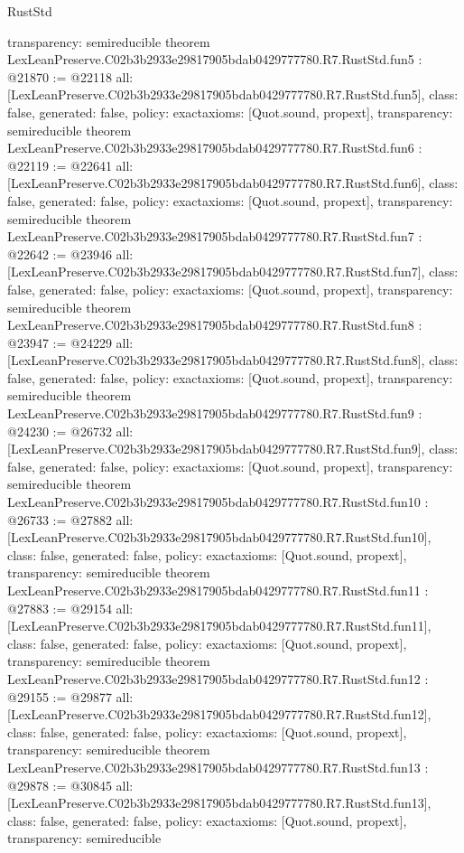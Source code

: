 \begin{lexlean}{RustStd}
\begin{coremodule}
{  transparency: semireducible
}
theorem LexLeanPreserve.C02b3b2933e29817905bdab0429777780.R7.RustStd.fun5 : @21870 := @22118 {
  all: [LexLeanPreserve.C02b3b2933e29817905bdab0429777780.R7.RustStd.fun5],
  class: false,
  generated: false,
  policy: exact{axioms: [Quot.sound, propext]},
  transparency: semireducible
}
theorem LexLeanPreserve.C02b3b2933e29817905bdab0429777780.R7.RustStd.fun6 : @22119 := @22641 {
  all: [LexLeanPreserve.C02b3b2933e29817905bdab0429777780.R7.RustStd.fun6],
  class: false,
  generated: false,
  policy: exact{axioms: [Quot.sound, propext]},
  transparency: semireducible
}
theorem LexLeanPreserve.C02b3b2933e29817905bdab0429777780.R7.RustStd.fun7 : @22642 := @23946 {
  all: [LexLeanPreserve.C02b3b2933e29817905bdab0429777780.R7.RustStd.fun7],
  class: false,
  generated: false,
  policy: exact{axioms: [Quot.sound, propext]},
  transparency: semireducible
}
theorem LexLeanPreserve.C02b3b2933e29817905bdab0429777780.R7.RustStd.fun8 : @23947 := @24229 {
  all: [LexLeanPreserve.C02b3b2933e29817905bdab0429777780.R7.RustStd.fun8],
  class: false,
  generated: false,
  policy: exact{axioms: [Quot.sound, propext]},
  transparency: semireducible
}
theorem LexLeanPreserve.C02b3b2933e29817905bdab0429777780.R7.RustStd.fun9 : @24230 := @26732 {
  all: [LexLeanPreserve.C02b3b2933e29817905bdab0429777780.R7.RustStd.fun9],
  class: false,
  generated: false,
  policy: exact{axioms: [Quot.sound, propext]},
  transparency: semireducible
}
theorem LexLeanPreserve.C02b3b2933e29817905bdab0429777780.R7.RustStd.fun10 : @26733 := @27882 {
  all: [LexLeanPreserve.C02b3b2933e29817905bdab0429777780.R7.RustStd.fun10],
  class: false,
  generated: false,
  policy: exact{axioms: [Quot.sound, propext]},
  transparency: semireducible
}
theorem LexLeanPreserve.C02b3b2933e29817905bdab0429777780.R7.RustStd.fun11 : @27883 := @29154 {
  all: [LexLeanPreserve.C02b3b2933e29817905bdab0429777780.R7.RustStd.fun11],
  class: false,
  generated: false,
  policy: exact{axioms: [Quot.sound, propext]},
  transparency: semireducible
}
theorem LexLeanPreserve.C02b3b2933e29817905bdab0429777780.R7.RustStd.fun12 : @29155 := @29877 {
  all: [LexLeanPreserve.C02b3b2933e29817905bdab0429777780.R7.RustStd.fun12],
  class: false,
  generated: false,
  policy: exact{axioms: [Quot.sound, propext]},
  transparency: semireducible
}
theorem LexLeanPreserve.C02b3b2933e29817905bdab0429777780.R7.RustStd.fun13 : @29878 := @30845 {
  all: [LexLeanPreserve.C02b3b2933e29817905bdab0429777780.R7.RustStd.fun13],
  class: false,
  generated: false,
  policy: exact{axioms: [Quot.sound, propext]},
  transparency: semireducible
}
\end{coremodule}
\end{lexlean}
